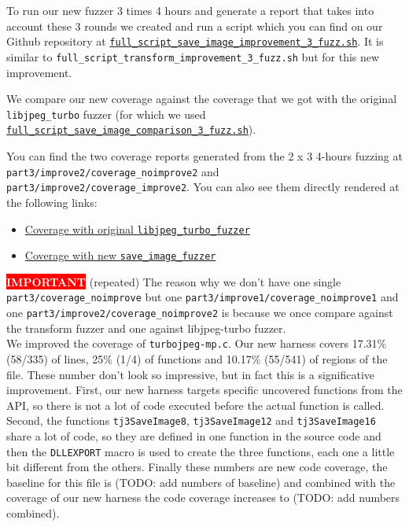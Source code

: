 \documentclass[12pt]{article}
\newcommand{\badgecolorbox}[2]{%
  \colorbox{#1}{\textcolor{white}{\bfseries #2}}%
}
\begin{document}
To run our new fuzzer 3 times 4 hours and generate a report that takes into account these 3 rounds we created and run a script which you can find on our Github repository at \href{https://github.com/roxannecvl/oss-fuzz/blob/main/scripts/full_script_save_image_improvement_3_fuzz.sh}{\texttt{full\_script\_save\_image\_improvement\_3\_fuzz.sh}}. It is similar to {\texttt{full\_script\_transform\_improvement\_3\_fuzz.sh}} but for this new improvement. 

We compare our new coverage against the coverage that we got with the original \texttt{libjpeg\_turbo} fuzzer (for which we used \href{https://github.com/roxannecvl/oss-fuzz/blob/main/scripts/full_script_save_image_comparison_3_fuzz.sh}{\texttt{full\_script\_save\_image\_comparison\_3\_fuzz.sh}}). 

You can find the two coverage reports generated from the 2 x 3 4-hours fuzzing at \texttt{part3/improve2/coverage\_noimprove2} and \texttt{part3/improve2/coverage\_improve2}. You can also see them directly rendered at the following links: 
\begin{itemize}
    \item \href{https://roxannecvl.github.io/oss-fuzz/coverage_reports/coverage_noimprove2/linux/report.html}{Coverage with original \texttt{libjpeg\_turbo\_fuzzer}}

    \item \href{https://roxannecvl.github.io/oss-fuzz/coverage_reports/coverage_improve2/linux/report.html}{Coverage with new \texttt{save\_image\_fuzzer}}
\end{itemize}


\badgecolorbox{red}{IMPORTANT} (repeated)
The reason why we don't have one single \texttt{part3/coverage\_noimprove} but one \texttt{part3/improve1/coverage\_noimprove1} and one \texttt{part3/improve2/coverage\_noimprove2} is because we once compare against the transform fuzzer and one against libjpeg-turbo fuzzer. \\





\noindent We improved the coverage of \texttt{turbojpeg-mp.c}. Our new harness covers 17.31\% (58/335) of lines, 25\% (1/4) of functions and 10.17\% (55/541) of regions of the file. These number don't look so impressive, but in fact this is a significative improvement. First, our new harness targets specific uncovered functions from the API, so there is not a lot of code executed before the actual function is called. Second, the functions \texttt{tj3SaveImage8}, \texttt{tj3SaveImage12} and \texttt{tj3SaveImage16} share a lot of code, so they are defined in one function in the source code and then the \texttt{DLLEXPORT} macro is used to create the three functions, each one a little bit different from the others. Finally these numbers are new code coverage, the baseline for this file is (TODO: add numbers of baseline) and combined with the coverage of our new harness the code coverage increases to (TODO: add numbers combined).\\
\end{document}
